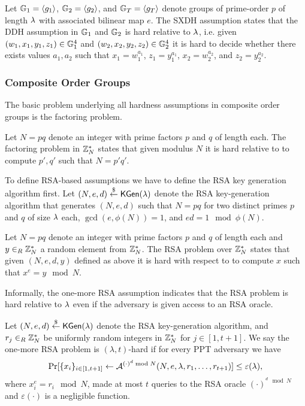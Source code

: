 \begin{definition}\label{def:sxdh}
Let $\GG_1=\genG[1]$, $\GG_2=\genG[2]$, and $\GG_T=\genG[T]$ denote groups of prime-order $p$ of length $\secpar$ with associated bilinear map $e$.
The \ac{SXDH} assumption states that the DDH assumption in $\GG_1$ and $\GG_2$ is hard relative to $\secpar$, i.e. given $(w_1,x_1,y_1,z_1)\in\GG^4_1$ and $(w_2,x_2,y_2,z_2)\in\GG^4_2$ it is hard to decide whether there exists values $a_1,a_2$ such that $x_1=w_1^{a_1}$, $z_1=y_1^{a_1}$, $x_2=w_2^{a_2}$, and $z_2=y_2^{a_2}$.
\eod
\end{definition}

\subsubsection{Composite Order Groups}
The basic problem underlying all hardness assumptions in composite order groups is the factoring problem.

\begin{definition}\label{def:factoring}
Let $N=pq$ denote an integer with prime factors $p$ and $q$ of length \secpar each.
The factoring problem in $\ZZ^\ast_N$ states that given modulus $N$ it is hard relative to \secpar to compute $p',q'$ such that $N=p'q'$.
\eod
\end{definition}

\noindent
To define RSA-based assumptions we have to define the RSA key generation algorithm first.
Let $(N, e, d)\ralgout\KGen(\secpar)$ denote the RSA key-generation algorithm that generates $(N, e, d)$ such that $N=pq$ for two distinct primes $p$ and $q$ of size $\secpar$ each, $\gcd(e, \phi(N))=1$, and $ed=1\mod \phi(N)$.

\begin{definition}\label{def:rsa}
Let $N=pq$ denote an integer with prime factors $p$ and $q$ of length \secpar each and $y\rin\ZZ^\ast_N$ a random element from $\ZZ^\ast_N$.
The RSA problem over $\ZZ^\ast_N$ states that given $(N,e,d,y)$ defined as above it is hard with respect to \secpar to compute $x$ such that $x^e = y \mod N$.
\eod
\end{definition}

\noindent
Informally, the one-more RSA assumption indicates that the RSA problem is hard relative to $\secpar$ even if the adversary is given access to an RSA oracle.

\begin{definition}\label{def:onemoreRSA}
Let $(N, e, d)\ralgout\KGen(\lambda)$ denote the RSA key-generation algorithm, and $r_j\rin\ZZ^\ast_N$ be uniformly random integers in $\ZZ^\ast_N$ for $j\in[1,t+1]$.
We say the one-more RSA problem is $(\lambda, t)$-hard if for every PPT adversary \cA we have
\[ \Pr[\{x_i\}_{i\in[1,t+1]} \gets \cA^{(\cdot)^d \bmod N}(N, e, \lambda, r_1, \dots, r_{t+1})] \leq \varepsilon(\secpar), \]
where $x_i^e=r_i\mod N$, \cA made at most $t$ queries to the RSA oracle $(\cdot)^{^d \mod N}$ and $\varepsilon(\cdot)$ is a negligible function.
\eod
\end{definition}


